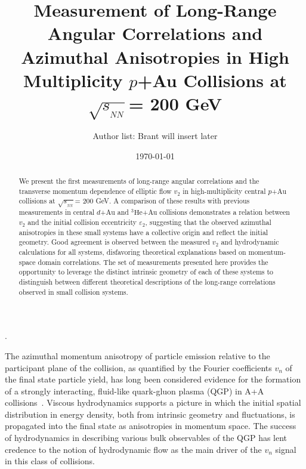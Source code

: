 \documentclass[%
reprint,
showpacs,preprintnumbers,
 amsmath,amssymb,
 aps,
]{revtex4-1}
\newcommand{\sqsn}{\mbox{$\sqrt{s_{_{NN}}}$}\xspace}
\newcommand{\dau}{\mbox{$d$+Au}\xspace}
\newcommand{\pau}{\mbox{$p$+Au}\xspace}
\newcommand{\hau}{\mbox{$^3\text{He}$+Au}\xspace}
\begin{document}
\title{Measurement of Long-Range Angular Correlations and Azimuthal Anisotropies in High Multiplicity \pau Collisions at \sqsn = 200 GeV}%

\author{Author list: Brant will insert later}

\date{\today}%

\begin{abstract}
We present the first measurements of long-range angular correlations and the transverse momentum dependence of elliptic flow $v_2$ in high-multiplicity central \pau collisions at \sqsn = 200 GeV. A comparison of these results with previous measurements in central \dau and \hau collisions demonstrates a relation between $v_2$ and the initial collision eccentricity $\varepsilon_2$, suggesting that the observed azimuthal anisotropies in these small systems have a collective origin and reflect the initial geometry. Good agreement is observed between the measured $v_2$ and hydrodynamic calculations for all systems, disfavoring theoretical explanations based on momentum-space domain correlations. The set of measurements presented here provides the opportunity to leverage the distinct intrinsic geometry of each of these systems to distinguish between different theoretical descriptions of the long-range correlations observed in small collision systems. 
\end{abstract}

\maketitle
.\clearpage

The azimuthal momentum anisotropy of particle emission relative to the participant plane of the collision, as quantified by the Fourier coefficients $v_n$ of the final state particle yield, has long been considered evidence for the formation of a strongly interacting, fluid-like quark-gluon plasma (QGP) in A+A collisions~\cite{Heinz:2013th}. Viscous hydrodynamics supports a picture in which the initial spatial distribution in energy density, both from intrinsic geometry and fluctuations, is propagated into the final state as anisotropies in momentum space. The success of hydrodynamics in describing various bulk observables of the QGP has lent credence to the notion of hydrodynamic flow as the main driver of the $v_{n}$ signal in this class of collisions.
\end{document}
